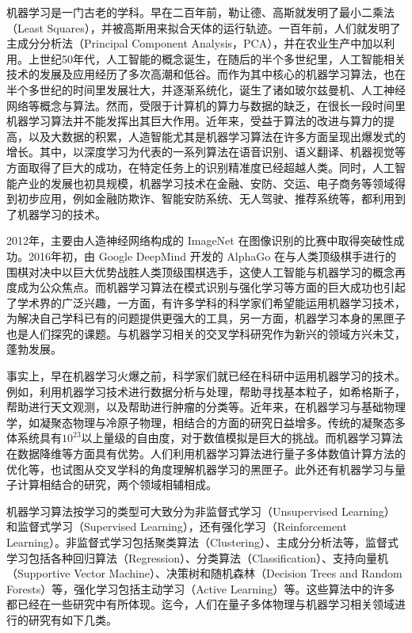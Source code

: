 机器学习是一门古老的学科。早在二百年前，勒让德、高斯就发明了最小二乘法（Least Squares），并被高斯用来拟合天体的运行轨迹。一百年前，人们就发明了主成分分析法（Principal Component Analysis，PCA）\cite{pearson1901,hotelling1933}，并在农业生产中加以利用\cite{pcabook}。上世纪50年代，人工智能的概念诞生，在随后的半个多世纪里，人工智能相关技术的发展及应用经历了多次高潮和低谷。而作为其中核心的机器学习算法，也在半个多世纪的时间里发展壮大，并逐渐系统化，诞生了诸如玻尔兹曼机、人工神经网络等概念与算法。然而，受限于计算机的算力与数据的缺乏，在很长一段时间里机器学习算法并不能发挥出其巨大作用。近年来，受益于算法的改进与算力的提高，以及大数据的积累，人造智能尤其是机器学习算法在许多方面呈现出爆发式的增长。其中，以深度学习\cite{dl2015}为代表的一系列算法在语音识别、语义翻译、机器视觉等方面取得了巨大的成功，在特定任务上的识别精准度已经超越人类。同时，人工智能产业的发展也初具规模，机器学习技术在金融、安防、交运、电子商务等领域得到初步应用，例如金融防欺诈、智能安防系统、无人驾驶、推荐系统等，都利用到了机器学习的技术。


2012年，主要由人造神经网络构成的 ImageNet 在图像识别的比赛中取得突破性成功\cite{imagenet2012}。2016年初，由 Google DeepMind 开发的 AlphaGo 在与人类顶级棋手进行的围棋对决中以巨大优势战胜人类顶级围棋选手，这使人工智能与机器学习的概念再度成为公众焦点。而机器学习算法在模式识别与强化学习等方面的巨大成功也引起了学术界的广泛兴趣，一方面，有许多学科的科学家们希望能运用机器学习技术，为解决自己学科已有的问题提供更强大的工具，另一方面，机器学习本身的黑匣子也是人们探究的课题。与机器学习相关的交叉学科研究作为新兴的领域方兴未艾，蓬勃发展\cite{mlrev1903}。

事实上，早在机器学习火爆之前，科学家们就已经在科研中运用机器学习的技术。例如，利用机器学习技术进行数据分析与处理，帮助寻找基本粒子，如希格斯子，帮助进行天文观测，以及帮助进行肿瘤的分类等。近年来，在机器学习与基础物理学，如凝聚态物理与冷原子物理，相结合的方面的研究日益增多。传统的凝聚态多体系统具有$10^{23}$以上量级的自由度，对于数值模拟是巨大的挑战。而机器学习算法在数据降维等方面具有优势。人们利用机器学习算法进行量子多体数值计算方法的优化等，也试图从交叉学科的角度理解机器学习的黑匣子。此外还有机器学习与量子计算相结合的研究\cite{qml2017,qai2017}，两个领域相辅相成。

机器学习算法按学习的类型可大致分为\cite{prmlbook}非监督式学习（Unsupervised Learning）和监督式学习（Supervised Learning），还有强化学习（Reinforcement Learning）。非监督式学习包括聚类算法（Clustering）、主成分分析法等，监督式学习包括各种回归算法（Regression）、分类算法（Classification）、支持向量机（Supportive Vector Machine）、决策树和随机森林（Decision Trees and Random Forests）等，强化学习包括主动学习（Active Learning）等。这些算法中的许多都已经在一些研究中有所体现。迄今，人们在量子多体物理与机器学习相关领域进行的研究有如下几类。

